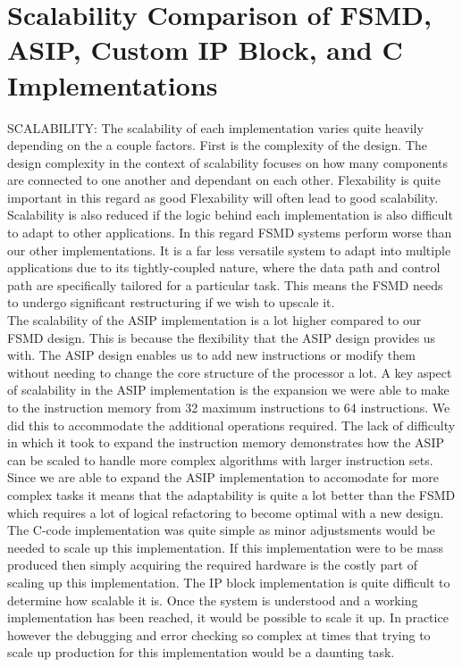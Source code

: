 \documentclass[conference]{IEEEtran}
\begin{document}
\section{Scalability Comparison of FSMD, ASIP, Custom IP Block, and C Implementations}
SCALABILITY:
The scalability of each implementation varies quite heavily depending on the a couple factors. First is the complexity of the design. The design complexity in the context of scalability focuses on how many components are connected to one another and dependant on each other. Flexability is quite important in this regard as good Flexability will often lead to good scalability. Scalability is also reduced if the logic behind each implementation is also difficult to adapt to other applications. In this regard FSMD systems perform worse than our other implementations. It is a far less versatile system to adapt into multiple applications due to its tightly-coupled nature, where the data path and control path are specifically tailored for a particular task. This means the FSMD needs to undergo significant restructuring if we wish to upscale it.\\
The scalability of the ASIP implementation is a lot higher compared to our FSMD design. This is because the flexibility that the ASIP design provides us with. The ASIP design enables us to add new instructions or modify them without needing to change the core structure of the processor a lot. A key aspect of scalability in the ASIP implementation is the expansion we were able to make to the instruction memory from 32 maximum instructions to 64 instructions. We did this to accommodate the additional operations required. The lack of difficulty in which it took to expand the instruction memory demonstrates how the ASIP can be scaled to handle more complex algorithms with larger instruction sets. Since we are able to expand the ASIP implementation to accomodate for more complex tasks it means that the adaptability is quite a lot better than the FSMD which requires a lot of logical refactoring to become optimal with a new design.\\
The C-code implementation was quite simple as minor adjustsments would be needed to scale up this implementation. If this implementation were to be mass produced then simply acquiring the required hardware is the costly part of scaling up this implementation. The IP block implementation is quite difficult to determine how scalable it is. Once the system is understood and a working implementation has been reached, it would be possible to scale it up. In practice however the debugging and error checking so complex at times that trying to scale up production for this implementation would be a daunting task. 
\end{document}
